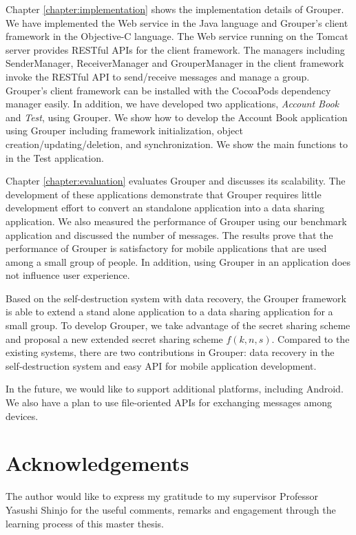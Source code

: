 \documentclass[a4paper,11pt]{report}
\begin{document}
Chapter \ref{chapter:implementation} shows the implementation details of Grouper.
We have implemented the Web service in the Java language and Grouper's client framework in the Objective-C language.
The Web service running on the Tomcat server provides RESTful APIs for the client framework. 
The managers including SenderManager, ReceiverManager and GrouperManager in the client framework invoke the RESTful API to send/receive messages and manage a group.
Grouper's client framework can be installed with the CocoaPods dependency manager easily.
In addition, we have developed two applications, \emph{Account Book} and \emph{Test}, using Grouper.
We show how to develop the Account Book application using Grouper including framework initialization, object creation/updating/deletion, and synchronization.
We show the main functions to in the Test application.

Chapter \ref{chapter:evaluation} evaluates Grouper and discusses its scalability.
The development of these applications demonstrate that Grouper requires little development effort to convert an standalone application into a data sharing application.
We also measured the performance of Grouper using our benchmark application and discussed the number of messages.
The results prove that the performance of Grouper is satisfactory for mobile applications that are used among a small group of people.
In addition, using Grouper in an application does not influence user experience.

Based on the self-destruction system with data recovery, the Grouper framework is able to extend a stand alone application to a data sharing application for a small group.
To develop Grouper, we take advantage of the secret sharing scheme and proposal a new extended secret sharing scheme $f(k, n, s)$.
Compared to the existing systems, there are two contributions in Grouper: data recovery in the self-destruction system and easy API for mobile application development.

In the future, we would like to support additional platforms, including Android.
We also have a plan to use file-oriented APIs for exchanging messages among devices.

\chapter*{Acknowledgements}

The author would like to express my gratitude to my supervisor Professor Yasushi Shinjo for the useful comments, remarks and engagement through the learning process of this master thesis.
\end{document}
